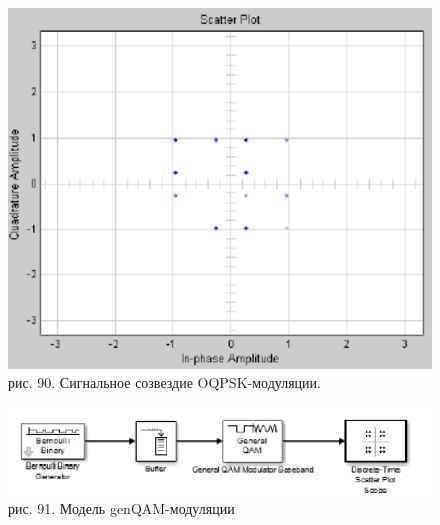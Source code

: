 \documentclass[10pt,a4paper]{report}
\begin{document}
\begin{figure}
\begin{center}
\includegraphics[width=150mm, scale = 0.9]{9_26}\newline
рис. 90. Сигнальное созвездие OQPSK-модуляции.\newline
\end{center}
\end{figure}
\begin{figure}
\begin{center}
\includegraphics[width=150mm, scale = 0.9]{9_27}\newline
рис. 91. Модель genQAM-модуляции\newline
\end{center}
\end{figure}
\end{document}
